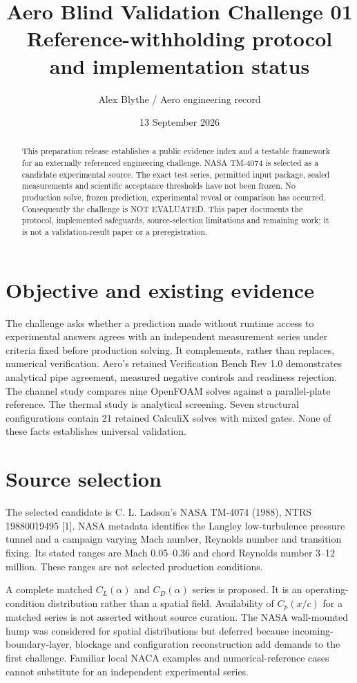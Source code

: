 \documentclass[10pt]{article}
\title{Aero Blind Validation Challenge 01\\\large Reference-withholding protocol and implementation status}
\author{Alex Blythe / Aero engineering record}\date{13 September 2026}
\begin{document}
\maketitle
\begin{abstract}
This preparation release establishes a public evidence index and a testable framework for an externally referenced engineering challenge. NASA TM-4074 is selected as a candidate experimental source. The exact test series, permitted input package, sealed measurements and scientific acceptance thresholds have not been frozen. No production solve, frozen prediction, experimental reveal or comparison has occurred. Consequently the challenge is NOT EVALUATED. This paper documents the protocol, implemented safeguards, source-selection limitations and remaining work; it is not a validation-result paper or a preregistration.
\end{abstract}
\section{Objective and existing evidence}
The challenge asks whether a prediction made without runtime access to experimental answers agrees with an independent measurement series under criteria fixed before production solving. It complements, rather than replaces, numerical verification. Aero's retained Verification Bench Rev 1.0 demonstrates analytical pipe agreement, measured negative controls and readiness rejection. The channel study compares nine OpenFOAM solves against a parallel-plate reference. The thermal study is analytical screening. Seven structural configurations contain 21 retained CalculiX solves with mixed gates. None of these facts establishes universal validation.
\section{Source selection}
The selected candidate is C. L. Ladson's NASA TM-4074 (1988), NTRS 19880019495 [1]. NASA metadata identifies the Langley low-turbulence pressure tunnel and a campaign varying Mach number, Reynolds number and transition fixing. Its stated ranges are Mach 0.05--0.36 and chord Reynolds number 3--12 million. These ranges are not selected production conditions.

A complete matched $C_L(\alpha)$ and $C_D(\alpha)$ series is proposed. It is an operating-condition distribution rather than a spatial field. Availability of $C_p(x/c)$ for a matched series is not asserted without source curation. The NASA wall-mounted hump was considered for spatial distributions but deferred because incoming-boundary-layer, blockage and configuration reconstruction add demands to the first challenge. Familiar local NACA examples and numerical-reference cases cannot substitute for an independent experimental series.
\end{document}
